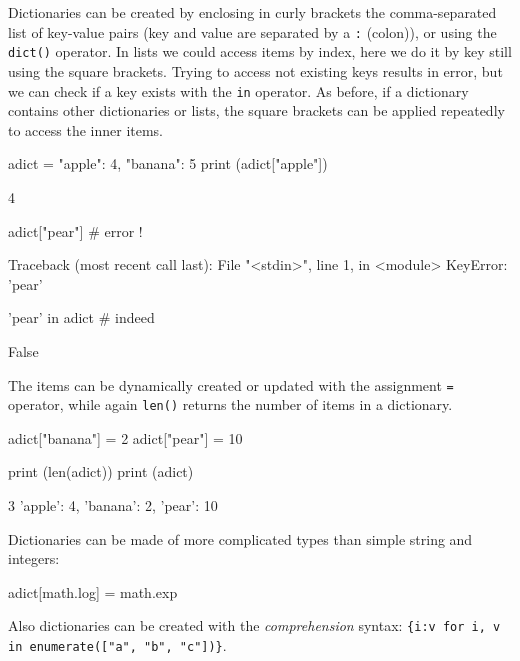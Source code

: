 \begin{ipythonnon}
Dictionaries can be created by enclosing in curly brackets the comma-separated list of key-value pairs (key and value are separated by a \texttt{:} (colon)), or using the \texttt{dict()} operator. In lists we could access items by index, here we do it by key still using the square brackets. Trying to access not existing keys results in error, but we can check if a key exists with the \texttt{in} operator. As before, if a dictionary contains other dictionaries or lists, the square brackets can be applied repeatedly to access the inner items.

\begin{ipythonnon}
adict = {"apple": 4, "banana": 5}
print (adict["apple"])
\end{ipythonnon}
\begin{ioutput}
4
\end{ioutput}

\begin{ipythonnon}
adict["pear"] # error !
\end{ipythonnon}
\begin{ioutput}
Traceback (most recent call last):
  File "<stdin>", line 1, in <module>
KeyError: 'pear'
\end{ioutput}

\begin{ipythonnon}
'pear' in adict # indeed
\end{ipythonnon}
\begin{ioutput}
False
\end{ioutput}

The items can be dynamically created or updated with the assignment \texttt{=} operator, while again \texttt{len()} returns the number of items in a dictionary.

\begin{ipythonnon}
adict["banana"] = 2
adict["pear"] = 10

print (len(adict))
print (adict)
\end{ipythonnon}
\begin{ioutput}
3
{'apple': 4, 'banana': 2, 'pear': 10}
\end{ioutput}

Dictionaries can be made of more complicated types than simple string and integers:

\begin{ipythonnon}
adict[math.log] = math.exp
\end{ipythonnon}

Also dictionaries can be created with the \emph{comprehension} syntax: \texttt{\{i:v for i, v in enumerate(["a", "b", "c"])\}}.


\end{ipythonnon}
